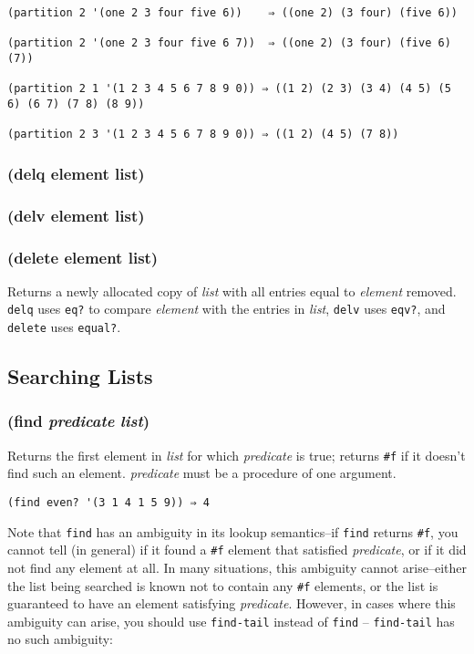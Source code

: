 \documentclass{article}
\begin{document}
\begin{verbatim}
(partition 2 '(one 2 3 four five 6))    ⇒ ((one 2) (3 four) (five 6))

(partition 2 '(one 2 3 four five 6 7))  ⇒ ((one 2) (3 four) (five 6) (7))

(partition 2 1 '(1 2 3 4 5 6 7 8 9 0)) ⇒ ((1 2) (2 3) (3 4) (4 5) (5 6) (6 7) (7 8) (8 9))

(partition 2 3 '(1 2 3 4 5 6 7 8 9 0)) ⇒ ((1 2) (4 5) (7 8))
\end{verbatim}

\subsubsection{(delq element list)}

\subsubsection{(delv element list)}

\subsubsection{(delete element list)}

Returns a newly allocated copy of \emph{list} with all entries equal to \emph{element}
removed. \verb|delq| uses \verb|eq?| to compare \emph{element} with the entries in
\emph{list}, \verb|delv| uses \verb|eqv?|, and \verb|delete| uses \verb|equal?|.

\subsection{Searching Lists}\label{sec:searching-lists}

\subsubsection{(find \emph{predicate} \emph{list})}

Returns the first element in \emph{list} for which \emph{predicate} is true; returns
\verb|#f| if it doesn't find such an element. \emph{predicate} must be a procedure of one
argument.

\begin{verbatim}
(find even? '(3 1 4 1 5 9)) ⇒ 4
\end{verbatim}

Note that \verb|find| has an ambiguity in its lookup semantics--if \verb|find| returns
\verb|#f|, you cannot tell (in general) if it found a \verb|#f| element that satisfied
\emph{predicate}, or if it did not find any element at all. In many situations, this ambiguity
cannot arise--either the list being searched is known not to contain any \verb|#f|
elements, or the list is guaranteed to have an element satisfying \emph{predicate}. However,
in cases where this ambiguity can arise, you should use \verb|find-tail| instead of
\verb|find| -- \verb|find-tail| has no such ambiguity:
\end{document}
